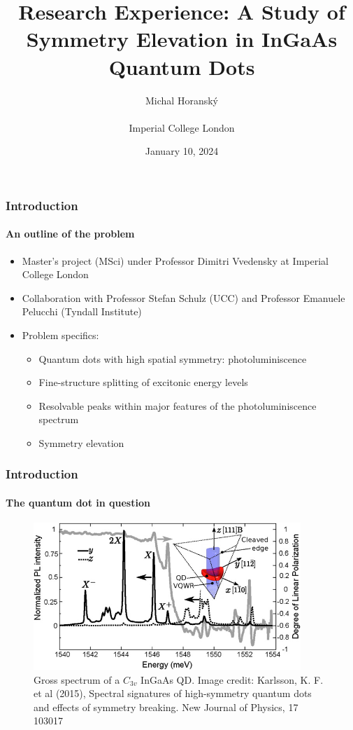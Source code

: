 \documentclass[english]{beamer}
\begin{document}
  \title{Research Experience: A Study of Symmetry Elevation in InGaAs Quantum Dots}
  \author[Michal Horanský]{Michal Horanský\\\hfill\\Imperial College London}
  \date{January 10, 2024}
  \begin{frame}
    \titlepage
  \end{frame}
  
  
  \begin{frame}
  	\frametitle{Introduction}
  	\framesubtitle{An outline of the problem}
  	\begin{itemize}
  		\item Master's project (MSci) under Professor Dimitri Vvedensky at Imperial College London
  		\item Collaboration with Professor Stefan Schulz (UCC) and Professor Emanuele Pelucchi (Tyndall Institute)
  		\item Problem specifics:
  		\begin{itemize}
  		\item Quantum dots with high spatial symmetry: photoluminiscence
  		\item Fine-structure splitting of excitonic energy levels
  		\item Resolvable peaks within major features of the photoluminiscence spectrum
  		\item Symmetry elevation
  		\end{itemize}
  	\end{itemize}
  \end{frame}
  
  \begin{frame}
  	\frametitle{Introduction}
  	\framesubtitle{The quantum dot in question}
  	
  	\begin{figure}
	\centering
    		\includegraphics[width=0.9\textwidth]{images/QD_schematic}
    		\caption{Gross spectrum of a $C_{3v}$ InGaAs QD. Image credit: Karlsson, K. F. et al (2015), Spectral signatures of high-symmetry quantum dots and effects of symmetry breaking. New Journal of Physics, 17 103017}
    		\label{fig:qd}
	\end{figure}
\end{frame}
\end{document}
